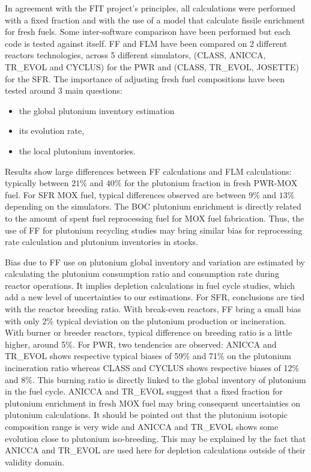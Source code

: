 In agreement with the FIT project’s principles, all calculations were performed with a fixed fraction and with the use of a model that calculate fissile enrichment for fresh fuels.
Some inter-software comparison have been performed but each code is tested against itself. \gls{FF} and \gls{FLM} have been compared on 2 different reactors technologies, across 5 different simulators, (CLASS, ANICCA, TR\_EVOL and CYCLUS) for the \gls{PWR} and (CLASS, TR\_EVOL, JOSETTE) for the \gls{SFR}.
The importance of adjusting fresh fuel compositions have been tested around 3 main questions:

\begin{itemize}
    \item the global plutonium inventory estimation 
    \item its evolution rate,
    \item the local plutonium inventories.
\end{itemize}
Results show large differences between \gls{FF} calculations and \gls{FLM} calculations: typically between $21\%$ and $40\%$ for the plutonium fraction in fresh \gls{PWR}-\gls{MOX} fuel.
For \gls{SFR} \gls{MOX} fuel, typical differences observed are between $9\%$ and $13\%$ depending on the simulators.
The \gls{BOC} plutonium enrichment is directly related to the amount of spent fuel reprocessing fuel for MOX fuel fabrication.
Thus, the use of \gls{FF} for plutonium recycling studies may bring similar bias for reprocessing rate calculation and plutonium inventories in stocks.

Bias due to \gls{FF} use on plutonium global inventory and variation are estimated by calculating the plutonium consumption ratio and consumption rate during reactor operations.
It implies depletion calculations in fuel cycle studies, which add a new level of uncertainties to our estimations.
For \gls{SFR}, conclusions are tied with the reactor breeding ratio.
With break-even reactors, \gls{FF} bring a small bias with only 2\% typical deviation on the plutonium production or incineration.
With burner or breeder reactors, typical difference on breeding ratio is a little higher, around 5\%.
For \gls{PWR}, two tendencies are observed: ANICCA and TR\_EVOL shows respective typical biases of 59\% and 71\% on the plutonium incineration ratio whereas CLASS and CYCLUS shows respective biases of 12\% and 8\%.
This burning ratio is directly linked to the global inventory of plutonium in the fuel cycle.
ANICCA and TR\_EVOL suggest that a fixed fraction for plutonium enrichment in fresh MOX fuel may bring consequent uncertainties on plutonium calculations.
It should be pointed out that the plutonium isotopic composition range is very wide and ANICCA and TR\_EVOL shows some evolution close to plutonium iso-breeding.
This may be explained by the fact that ANICCA and TR\_EVOL are used here for depletion calculations outside of their validity domain.

